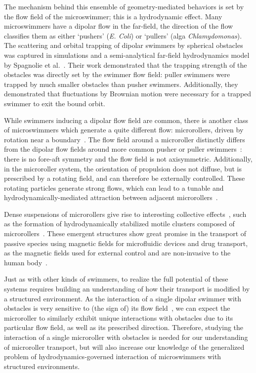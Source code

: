 \documentclass[12pt]{article}
\begin{document}
The mechanism behind this ensemble of geometry-mediated behaviors is set by the flow field of the microswimmer; this is a hydrodynamic effect.  Many microswimmers have a dipolar flow in the far-field, the direction of the flow classifies them as either `pushers' (\textit{E. Coli}) or `pullers' (alga \textit{Chlamydomonas}).  The scattering and orbital trapping of dipolar swimmers by spherical obstacles was captured in simulations and a semi-analytical far-field hydrodynamics model by Spagnolie et al.~\cite{spagnolie2015geometric}. Their work demonstrated that the trapping strength of the obstacles was directly set by the swimmer flow field: puller swimmers were trapped by much smaller obstacles than pusher swimmers.  Additionally, they demonstrated that fluctuations by Brownian motion were necessary for a trapped swimmer to exit the bound orbit. 

While swimmers inducing a dipolar flow field are common, there is another class of microswimmers which generate a quite different flow: microrollers, driven by rotation near a boundary~\cite{driscoll2017unstable}. The flow field around a microroller distinctly differs from the dipolar flow fields around more common pusher or puller swimmers~\cite{delmotte2017minimal,bechinger2016active,spagnolie2015geometric,liebchen2021interactions}: there is no fore-aft symmetry and the flow field is not axisymmetric.
Additionally, in the microroller system, the orientation of propulsion does not diffuse, but is prescribed by a rotating field, and can therefore be externally controlled. These rotating particles generate strong flows, which can lead to a tunable and hydrodynamically-mediated attraction between adjacent microrollers~\cite{driscoll2017unstable,martinez2018emergent,delmotte2019hydrodynamically}.  

Dense suspensions of microrollers give rise to interesting collective effects~\cite{driscoll2017unstable,sprinkle2017large,sprinkle2020active,junot2021collective}, such as the formation of hydrodynamically stabilized motile clusters composed of microrollers~\cite{driscoll2017unstable}.  These emergent structures show great promise in the transport of passive species using magnetic fields for microfluidic devices and drug transport, as the magnetic fields used for external control and are non-invasive to the human body~\cite{alapan2020multifunctional}.  

Just as with other kinds of swimmers, to realize the full potential of these systems requires building an understanding of how their transport is modified by a structured environment.  
As the interaction of a single dipolar swimmer with obstacles is very sensitive to (the sign of) its flow field~\cite{spagnolie2015geometric}, we can expect the microroller to similarly exhibit unique interactions with obstacles due to its particular flow field, as well as its prescribed direction. Therefore, studying the interaction of a single microroller with obstacles is needed for our understanding of microroller transport, but will also increase our knowledge of the generalized problem of hydrodynamics-governed interaction of microswimmers with structured environments.
\end{document}

